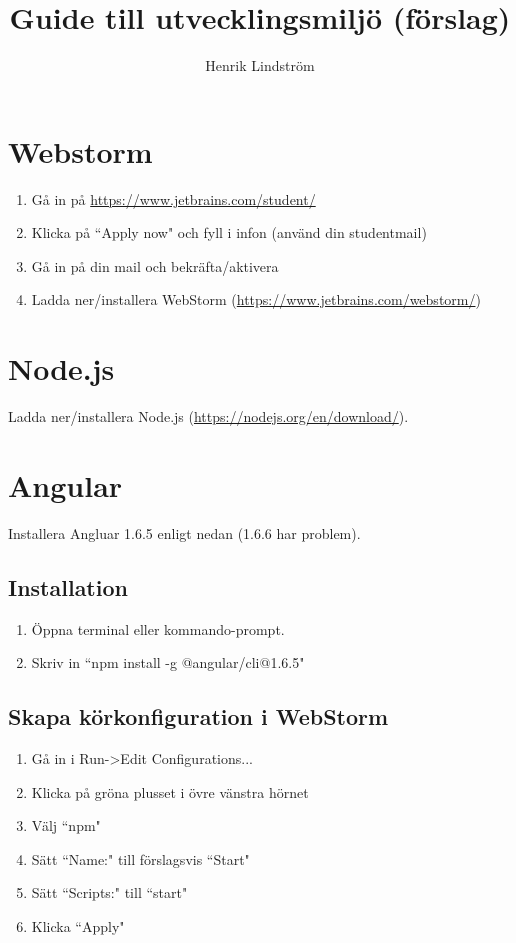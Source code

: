 \documentclass{article}
\title{Guide till utvecklingsmiljö (förslag)}
\author{Henrik Lindström}
\begin{document}
\maketitle
\section{Webstorm}
\begin{enumerate}
\item Gå in på \url{https://www.jetbrains.com/student/}
\item Klicka på ``Apply now" och fyll i infon (använd din studentmail)
\item Gå in på din mail och bekräfta/aktivera
\item Ladda ner/installera WebStorm (\url{https://www.jetbrains.com/webstorm/})
\end{enumerate}
\section{Node.js}
Ladda ner/installera Node.js (\url{https://nodejs.org/en/download/}).
\section{Angular}
Installera Angluar 1.6.5 enligt nedan (1.6.6 har problem).
\subsection{Installation}
\begin{enumerate}
\item Öppna terminal eller kommando-prompt.
\item Skriv in ``npm install -g @angular/cli@1.6.5"
\end{enumerate}
\subsection{Skapa körkonfiguration i WebStorm}
\begin{enumerate}
\item Gå in i Run-\textgreater Edit Configurations...
\item Klicka på gröna plusset i övre vänstra hörnet
\item Välj ``npm"
\item Sätt ``Name:" till förslagsvis ``Start"
\item Sätt ``Scripts:" till ``start"
\item Klicka ``Apply"
\end{enumerate}
\end{document}
